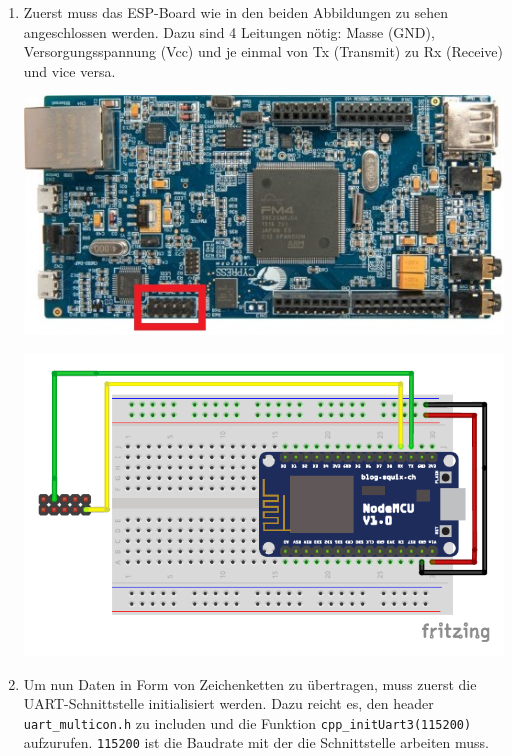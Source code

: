 \begin{enumerate}
	\item Zuerst muss das ESP-Board wie in den beiden Abbildungen zu sehen angeschlossen werden. Dazu sind 4 Leitungen nötig: Masse (GND), Versorgungsspannung (Vcc) und je einmal von Tx (Transmit) zu Rx (Receive) und vice versa.
	
	\begin{minipage}{.5\textwidth}
		\centering
		\includegraphics[width=\textwidth]{./05_c/figures/s6e2cc.jpg}
	\end{minipage}
	\begin{minipage}{.5\textwidth}		
		\centering
		\includegraphics[width=\textwidth]{./05_c/figures/wsnWiring_Steckplatine.pdf}
	\end{minipage}

	\item Um nun Daten in Form von Zeichenketten zu übertragen, muss zuerst die UART-Schnittstelle initialisiert werden. Dazu reicht es, den header \lstinline|uart_multicon.h| zu includen und die Funktion \lstinline|cpp_initUart3(115200)| aufzurufen. \lstinline|115200| ist die Baudrate mit der die Schnittstelle arbeiten muss.
	

\end{enumerate}

